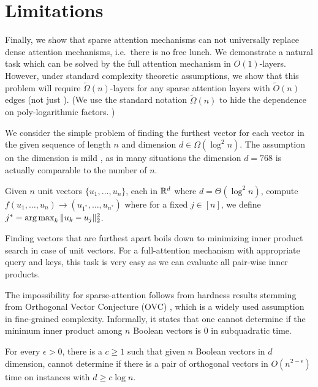 \section{Limitations} 
\label{sec:apndx-limit}

Finally, we show that sparse attention mechanisms can not universally replace dense attention mechanisms, i.e.~there is no free lunch.
We demonstrate a natural task which can be solved by the full attention mechanism in $O(1)$-layers.
However, under standard complexity theoretic assumptions, we show that this problem will require 
$\tilde{\Omega}(n)$-layers for any sparse attention layers with $\tilde{O}(n)$ edges (not just \bigb).
(We use the standard notation $\tilde{\Omega}(n)$  to hide the dependence on poly-logarithmic factors. )

We consider the simple problem of finding the furthest vector for each vector 
in the given sequence of length $n$ and dimension $d \in \Omega(\log^2n)$. The assumption on 
the dimension is mild , as in many situations the dimension $d =768$ is actually comparable to 
the number of $n$. 

\begin{task}
Given $n$ unit vectors $\{u_1,\dots,u_n\}$, each in $\mathbb{R}^d$ where $d=\Theta(\log^2n)$, 
compute $f(u_1,\dots,u_n) \to (u_{1^*}, \dots, u_{n^*})$  where for a fixed $j \in [n]$, we define 
$ j^* = \operatorname*{arg\,max}_{k} \|u_k - u_j\|_2^2$.
\end{task}

Finding vectors that are furthest apart boils down to minimizing inner product search 
in case of unit vectors. For a full-attention mechanism with appropriate query and keys, 
this task is very easy as we can evaluate all pair-wise inner products. 

The impossibility for sparse-attention follows from hardness results stemming from  
Orthogonal Vector Conjecture (OVC) \citep{abboud2015tight,abboud2014consequences,williams2005new,backurs2015edit}, which is a widely used assumption in fine-grained complexity. Informally, it states that 
one cannot determine if the minimum inner product among $n$ Boolean vectors is $0$ in 
subquadratic time.  
\begin{conjecture} \label{conj:ovc}
For every $\epsilon>0$, there is a $c \geq 1$ such that given $n$ Boolean vectors in 
$d$ dimension, cannot determine if there is a pair of orthogonal vectors in $O(n^{2-\epsilon})$
time on instances with $d  \geq  c \log n$. 
\end{conjecture}

